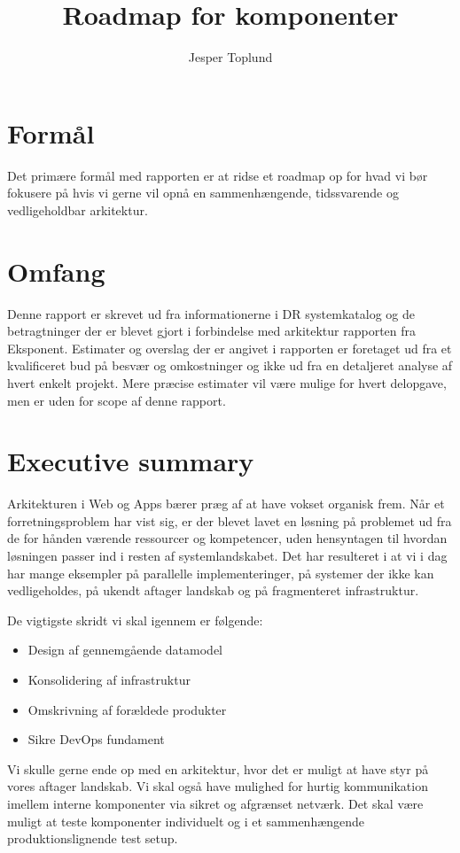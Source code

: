 \documentclass{article}
\author {Jesper Toplund}
\title{Roadmap for komponenter}
\date{}
\begin{document}
\maketitle

\vspace{20 mm}
\begin{quote}
    \textit{}
\end{quote}

\section{Formål}
Det primære formål med rapporten er at ridse et roadmap op for hvad vi bør fokusere på hvis vi gerne vil opnå en sammenhængende, tidssvarende og vedligeholdbar arkitektur.

\section{Omfang}
Denne rapport er skrevet ud fra informationerne i DR systemkatalog og de betragtninger der er blevet gjort i forbindelse med arkitektur rapporten fra Eksponent. Estimater og overslag der er angivet i rapporten er foretaget ud fra et kvalificeret bud på besvær og omkostninger og ikke ud fra en detaljeret analyse af hvert enkelt projekt. 
Mere præcise estimater vil være mulige for hvert delopgave, men er uden for scope af denne rapport.

\section{Executive summary}
Arkitekturen i Web og Apps bærer præg af at have vokset organisk frem. Når et forretningsproblem har vist sig, er der blevet lavet en løsning på problemet ud fra de for hånden værende ressourcer og kompetencer, uden hensyntagen til hvordan løsningen passer ind i resten af systemlandskabet. Det har resulteret i at vi i dag har mange eksempler på parallelle implementeringer, på systemer der ikke kan vedligeholdes, på ukendt aftager landskab og på fragmenteret infrastruktur.

De vigtigste skridt vi skal igennem er følgende:
\begin{itemize}
\item Design af gennemgående datamodel
\item Konsolidering af infrastruktur
\item Omskrivning af forældede produkter
\item Sikre DevOps fundament
\end{itemize}
Vi skulle gerne ende op med en arkitektur, hvor det er muligt at have styr på vores aftager landskab. Vi skal også have mulighed for hurtig kommunikation imellem interne komponenter via sikret og afgrænset netværk. Det skal være muligt at teste komponenter individuelt og i et sammenhængende produktionslignende test setup.
\end{document}
